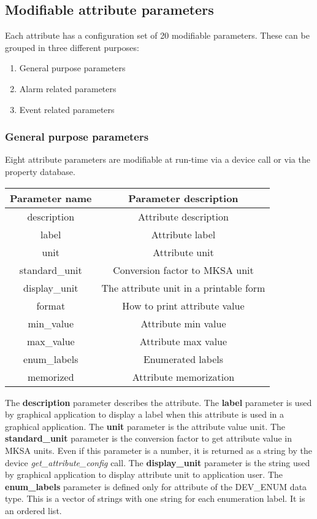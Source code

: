 \subsection{Modifiable attribute parameters}

Each attribute has a configuration set of 20 modifiable parameters.
These can be grouped in three different purposes:
\begin{enumerate}
\item General purpose parameters
\item Alarm related parameters
\item Event related parameters
\end{enumerate}

\subsubsection{General purpose parameters}

Eight attribute parameters are modifiable at run-time via a device
call or via the property database.

\vspace{0.3cm}


\begin{center}
\begin{longtable}{|c|c|}
\hline 
Parameter name & Parameter description\tabularnewline
\hline 
\hline 
description & Attribute description\tabularnewline
\hline 
label & Attribute label\tabularnewline
\hline 
unit & Attribute unit\tabularnewline
\hline 
standard\_unit & Conversion factor to MKSA unit\tabularnewline
\hline 
display\_unit & The attribute unit in a printable form\tabularnewline
\hline 
format & How to print attribute value\tabularnewline
\hline 
min\_value & Attribute min value\tabularnewline
\hline 
max\_value & Attribute max value\tabularnewline
\hline 
enum\_labels & Enumerated labels\tabularnewline
\hline 
memorized & Attribute memorization\tabularnewline
\hline 
\end{longtable}
\par\end{center}

\vspace{0.3cm}


The \textbf{description} parameter describes the
attribute. The \textbf{label} parameter is used by graphical
application to display a label when this attribute is used in a graphical
application. The \textbf{unit} parameter is the attribute
value unit. The \textbf{standard\_unit} parameter
is the conversion factor to get attribute value in MKSA units. Even
if this parameter is a number, it is returned as a string by the device
\emph{get\_attribute\_config} call. The \textbf{display\_unit}
parameter is the string used by graphical application to display attribute
unit to application user. The \textbf{enum\_labels}
parameter is defined only for attribute of the DEV\_ENUM data type.
This is a vector of strings with one string for each enumeration label.
It is an ordered list.


